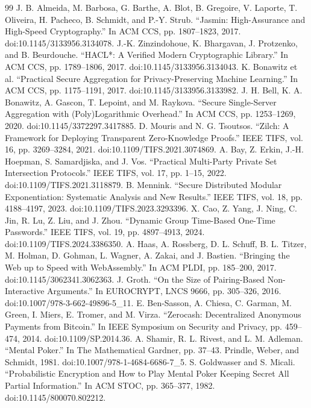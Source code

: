 \documentclass[11pt]{article}
\begin{document}
\begin{thebibliography}{99}
 J. B. Almeida, M. Barbosa, G. Barthe, A. Blot, B. Gregoire, V. Laporte, T. Oliveira, H. Pacheco, B. Schmidt, and P.-Y. Strub. “Jasmin: High-Assurance and High-Speed Cryptography.” In ACM CCS, pp. 1807–1823, 2017. doi:10.1145/3133956.3134078.
 J.-K. Zinzindohoue, K. Bhargavan, J. Protzenko, and B. Beurdouche. “HACL*: A Verified Modern Cryptographic Library.” In ACM CCS, pp. 1789–1806, 2017. doi:10.1145/3133956.3134043.
 K. Bonawitz et al. “Practical Secure Aggregation for Privacy-Preserving Machine Learning.” In ACM CCS, pp. 1175–1191, 2017. doi:10.1145/3133956.3133982.
 J. H. Bell, K. A. Bonawitz, A. Gascon, T. Lepoint, and M. Raykova. “Secure Single-Server Aggregation with (Poly)Logarithmic Overhead.” In ACM CCS, pp. 1253–1269, 2020. doi:10.1145/3372297.3417885.
 D. Mouris and N. G. Tsoutsos. “Zilch: A Framework for Deploying Transparent Zero-Knowledge Proofs.” IEEE TIFS, vol. 16, pp. 3269–3284, 2021. doi:10.1109/TIFS.2021.3074869.
 A. Bay, Z. Erkin, J.-H. Hoepman, S. Samardjiska, and J. Vos. “Practical Multi-Party Private Set Intersection Protocols.” IEEE TIFS, vol. 17, pp. 1–15, 2022. doi:10.1109/TIFS.2021.3118879.
 B. Mennink. “Secure Distributed Modular Exponentiation: Systematic Analysis and New Results.” IEEE TIFS, vol. 18, pp. 4188–4197, 2023. doi:10.1109/TIFS.2023.3293396.
 X. Cao, Z. Yang, J. Ning, C. Jin, R. Lu, Z. Liu, and J. Zhou. “Dynamic Group Time-Based One-Time Passwords.” IEEE TIFS, vol. 19, pp. 4897–4913, 2024. doi:10.1109/TIFS.2024.3386350.
 A. Haas, A. Rossberg, D. L. Schuff, B. L. Titzer, M. Holman, D. Gohman, L. Wagner, A. Zakai, and J. Bastien. “Bringing the Web up to Speed with WebAssembly.” In ACM PLDI, pp. 185–200, 2017. doi:10.1145/3062341.3062363.
 J. Groth. “On the Size of Pairing-Based Non-Interactive Arguments.” In EUROCRYPT, LNCS 9666, pp. 305–326, 2016. doi:10.1007/978-3-662-49896-5\_11.
 E. Ben-Sasson, A. Chiesa, C. Garman, M. Green, I. Miers, E. Tromer, and M. Virza. “Zerocash: Decentralized Anonymous Payments from Bitcoin.” In IEEE Symposium on Security and Privacy, pp. 459–474, 2014. doi:10.1109/SP.2014.36.
 A. Shamir, R. L. Rivest, and L. M. Adleman. “Mental Poker.” In The Mathematical Gardner, pp. 37–43. Prindle, Weber, and Schmidt, 1981. doi:10.1007/978-1-4684-6686-7\_5.
 S. Goldwasser and S. Micali. “Probabilistic Encryption and How to Play Mental Poker Keeping Secret All Partial Information.” In ACM STOC, pp. 365–377, 1982. doi:10.1145/800070.802212.

\end{thebibliography}
\end{document}
